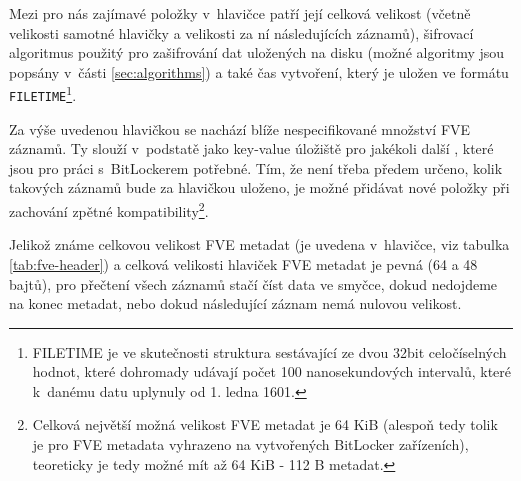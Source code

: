 
Mezi pro nás zajímavé položky v~hlavičce patří její celková velikost (včetně velikosti samotné hlavičky a velikosti za ní následujících záznamů), šifrovací algoritmus použitý pro zašifrování dat uložených na disku (možné algoritmy jsou popsány v~části \ref{sec:algorithms}) a také čas vytvoření, který je uložen ve formátu \texttt{FILETIME}\footnote{FILETIME je ve skutečnosti struktura sestávající ze dvou 32bit celočíselných hodnot, které dohromady udávají počet 100 nanosekundových intervalů, které k~danému datu uplynuly od 1. ledna 1601.\cite{Zxwr6wjYZUQ6z8Yp}}.

\label{sec:fve-metadata-entry}

Za výše uvedenou hlavičkou se nachází blíže nespecifikované množství FVE záznamů. Ty slouží v~podstatě jako key-value úložiště pro jakékoli další , které jsou pro práci s~BitLockerem potřebné. Tím, že není třeba předem určeno, kolik takových záznamů bude za hlavičkou uloženo, je možné přidávat nové položky při zachování zpětné kompatibility\footnote{Celková největší možná velikost FVE metadat je 64 KiB (alespoň tedy tolik je pro FVE metadata vyhrazeno na vytvořených BitLocker zařízeních), teoreticky je tedy možné mít až 64 KiB - 112 B metadat.}.

Jelikož známe celkovou velikost FVE metadat (je uvedena v~hlavičce, viz tabulka \ref{tab:fve-header}) a celková velikosti hlaviček FVE metadat je pevná (64 a 48 bajtů), pro přečtení všech záznamů stačí číst data ve smyčce, dokud nedojdeme na konec metadat, nebo dokud následující záznam nemá nulovou velikost.

